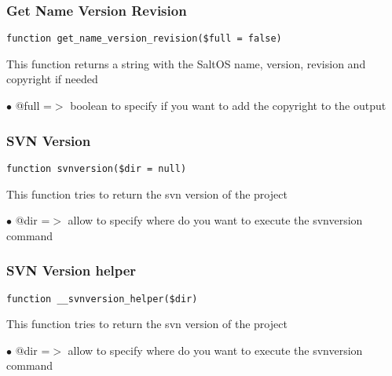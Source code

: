 \documentclass[a4paper]{article}
\begin{document}
\subsubsection{Get Name Version Revision}

\begin{lstlisting}
function get_name_version_revision($full = false)
\end{lstlisting}

This function returns a string with the SaltOS name, version, revision and
copyright if needed

\begin{compactitem}
\item[\color{myblue}$\bullet$] @full =$>$ boolean to specify if you want to add the copyright to the output
\end{compactitem}

\hypertarget{toc269}{}
\subsubsection{SVN Version}

\begin{lstlisting}
function svnversion($dir = null)
\end{lstlisting}

This function tries to return the svn version of the project

\begin{compactitem}
\item[\color{myblue}$\bullet$] @dir =$>$ allow to specify where do you want to execute the svnversion command
\end{compactitem}

\hypertarget{toc270}{}
\subsubsection{SVN Version helper}

\begin{lstlisting}
function __svnversion_helper($dir)
\end{lstlisting}

This function tries to return the svn version of the project

\begin{compactitem}
\item[\color{myblue}$\bullet$] @dir =$>$ allow to specify where do you want to execute the svnversion command
\end{compactitem}
\end{document}
